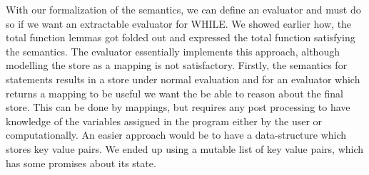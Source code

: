 With our formalization of the semantics, we can define an evaluator and must do so if we want an extractable evaluator for WHILE.
We showed earlier how, the total function lemmas got folded out and expressed
the total function satisfying the semantics.
The evaluator essentially implements this approach, although modelling the store as a mapping is not satisfactory.
Firstly, the semantics for statements results in a store under normal evaluation
and for an evaluator which returns a mapping to be useful we want the be able to
reason about the final store.
This can be done by mappings, but requires any post processing to have knowledge
of the variables assigned in the program either by the user or computationally.
An easier approach would be to have a data-structure which stores key value pairs.
We ended up using a mutable list of key value pairs, which has some promises about its state.

